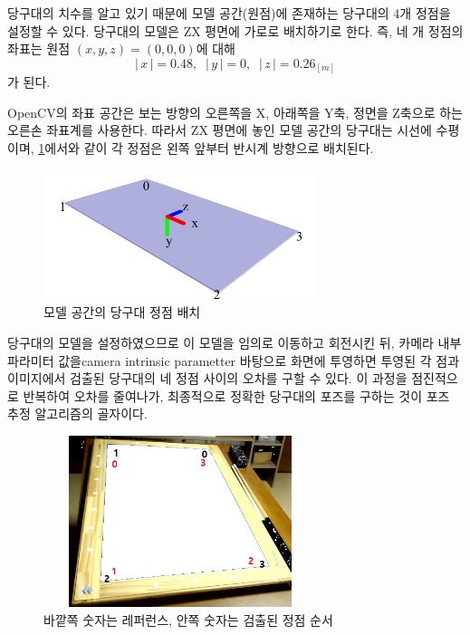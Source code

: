 \documentclass[10pt]{oblivoir}
\newcommand{\textss}[1]{\scriptsize#1\normalsize}
\newcommand{\abs}[1]{\left|\,#1\,\right|}
\begin{document}
당구대의 치수를 알고 있기 때문에 모델 공간(원점)에 존재하는 당구대의 4개 정점을 설정할 수 있다. 당구대의 모델은 ZX 평면에 가로로 배치하기로 한다. 즉, 네 개 정점의 좌표는 원점 $(x,y,z)=(0,0,0)$에 대해 $$\abs{x}=0.48,\;\;\abs{y}=0,\;\;\abs{z}=0.26 _{[m]}$$가 된다.

OpenCV의 좌표 공간은 보는 방향의 오른쪽을 X, 아래쪽을 Y축, 정면을 Z축으로 하는 오른손 좌표계를 사용한다. 따라서 ZX 평면에 놓인 모델 공간의 당구대는 시선에 수평이며, \cref{fig;table-3d-model}에서와 같이 각 정점은 왼쪽 앞부터 반시계 방향으로 배치된다.

\begin{figure}[ht]
    \centering
    \includegraphics[width=8cm]{img/table-3d.pdf}
    \caption{모델 공간의 당구대 정점 배치}
    \label{fig;table-3d-model}
\end{figure}

당구대의 모델을 설정하였으므로 이 모델을 임의로 이동하고 회전시킨 뒤, 카메라 내부 파라미터 값을\textss{cam\-era intrinsic parametter} 바탕으로 화면에 투영하면 투영된 각 점과 이미지에서 검출된 당구대의 네 정점 사이의 오차를 구할 수 있다. 이 과정을 점진적으로 반복하여 오차를 줄여나가, 최종적으로 정확한 당구대의 포즈를 구하는 것이 포즈 추정 알고리즘의 골자이다.

\begin{figure}[ht]
    \begin{center}
        \includegraphics[width=8cm, height=5cm, keepaspectratio]{img/billiards-table-indexes.png}
    \end{center}
    \caption{바깥쪽 숫자는 레퍼런스, 안쪽 숫자는 검출된 정점 순서}
    \label{fig;pool-table-invalid-index}
\end{figure}
\end{document}
